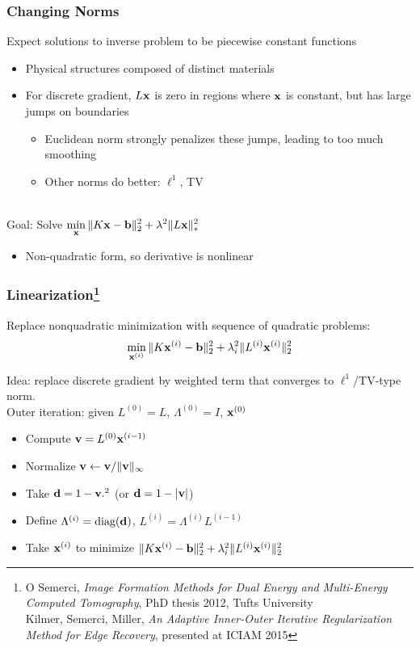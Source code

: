 \documentclass[12pt,t,xcolor=dvipsnames]{beamer}
\renewcommand{\vec}[1]{{\bf #1}}
\renewcommand{\vec}[1]{{\bf #1}}
\begin{document}
\begin{frame}
\frametitle{Changing Norms}
Expect solutions to inverse problem to be piecewise constant functions
\begin{itemize}
\item Physical structures composed of distinct materials
\item For discrete gradient, $L\vec{x}$ is zero in regions where $\vec{x}$ is constant, but
  has large jumps on boundaries
  \begin{itemize}
  \item Euclidean norm strongly penalizes these jumps, leading to too
    much smoothing
    \item Other norms do better: $\ell^1$, TV
  \end{itemize}
  
\end{itemize}
\ \\[12pt]

\pause
\alert{Goal:} Solve $\displaystyle\min_{\vec{x}}
\|K\vec{x}-\vec{b}\|_2^2 + \lambda^2\|L\vec{x}\|_\ast^2$
\begin{itemize}
\item Non-quadratic form, so derivative is nonlinear
  \end{itemize}
\end{frame}

\begin{frame}
  \frametitle{Linearization\footnote{O Semerci, {\it Image Formation
        Methods for Dual Energy and Multi-Energy Computed Tomography},
      PhD thesis 2012, Tufts University\\
  Kilmer, Semerci, Miller, {\it An Adaptive Inner-Outer Iterative
Regularization Method for Edge Recovery}, presented at ICIAM 2015}}
  Replace nonquadratic minimization with sequence of quadratic
  problems:\\[-24pt]
  \[
\min_{\vec{x}^{(i)}}
\|K\vec{x}^{(i)}-\vec{b}\|_2^2 + \lambda_i^2\|L^{(i)}\vec{x}^{(i)}\|_2^2
  \]

  \alert{Idea:} replace discrete gradient by weighted term that converges to
  $\ell^1$/TV-type norm. \\[6pt]

  Outer iteration: given $L^{(0)} = L$, $\Lambda^{(0)} = I$, $\vec{x}^{(0)}$
  \begin{itemize}
  \item Compute $\vec{v} = L^{(0)}\vec{x}^{(i-1)}$
  \item Normalize $\vec{v} \leftarrow \vec{v}/\|\vec{v}\|_\infty$
  \item Take $\vec{d} = 1-\vec{v}.^2$ (or $\vec{d} = 1-|\vec{v}|$)
  \item Define $\Lambda^{(i)} = \text{diag}(\vec{d})$, $L^{(i)} =
    \Lambda^{(i)}L^{(i-1)}$
    \item Take $\vec{x}^{(i)}$ to minimize $\|K\vec{x}^{(i)}-\vec{b}\|_2^2 + \lambda_i^2\|L^{(i)}\vec{x}^{(i)}\|_2^2$
  \end{itemize}
  
\end{frame}
\end{document}
